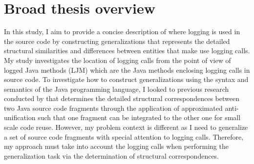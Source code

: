 %
%
%



\section{Broad thesis overview} \label{intro-overview}

In this study, I aim to provide a concise description of where logging is used in the source code by constructing generalizations that represents the detailed structural similarities and differences between entities that make use logging calls. My study investigates the location of logging calls from the point of view of logged Java methods (LJM) which are the Java methods enclosing logging calls in source code. To investigate how to construct generalizations using the syntax and semantics of the Java programming language, I looked to previous research conducted by \citet{2008:fse:cottrell} that determines the detailed structural correspondences between two Java source code fragments through the application of approximated anti-unification such that one fragment can be integrated to the other one for small scale code reuse. However, my problem context is different as I need to generalize a set of source code fragments with special attention to logging calls. Therefore, my approach must take into account the logging calls when performing the generalization task via the determination of structural correspondences.

